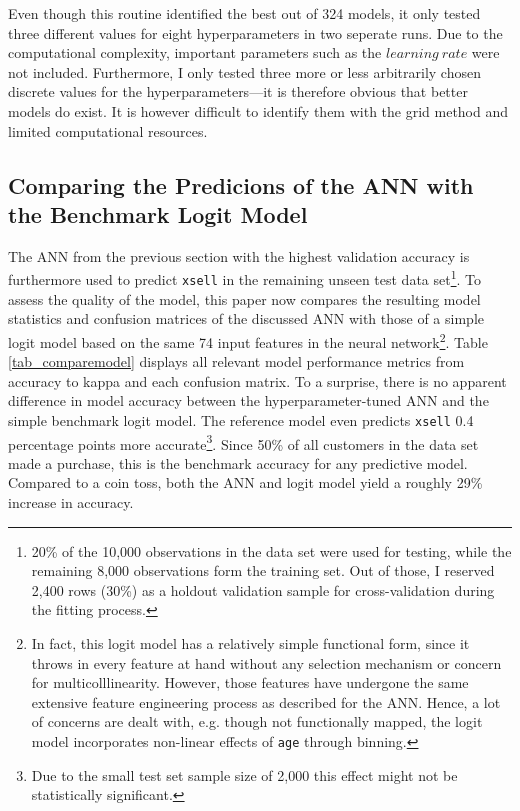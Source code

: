 \documentclass[12pt,a4paper]{article}
\let\code=\texttt
\begin{document}
Even though this routine identified the best out of 324 models, it only tested three different values for eight hyperparameters in two seperate runs.
Due to the computational complexity, important parameters such as the $learning\ rate$ were not included.
Furthermore, I only tested three more or less arbitrarily chosen discrete values for the hyperparameters---it is therefore obvious that
better models do exist. It is however difficult to identify them with the grid method and limited computational resources.

\subsection{Comparing the Predicions of the ANN with the Benchmark Logit Model}

The ANN from the previous section with the highest validation accuracy is furthermore used to predict \code{xsell} in the remaining unseen test data set\footnote{20\% 
of the 10,000 observations in the data set were used for testing, while the remaining 8,000 observations form the training set. Out of those, I reserved
2,400 rows (30\%) as a holdout validation sample for cross-validation during the fitting process.}.
To assess the quality of the model, this paper now compares the resulting model statistics and confusion matrices of the discussed ANN with those of a 
simple logit model based on the same 74 input features in the neural network\footnote{In fact, this logit model has a relatively simple functional form, 
since it throws in every feature at hand without any selection mechanism or concern for multicolllinearity.
However, those features have undergone the same extensive feature engineering process as described for the ANN.
Hence, a lot of concerns are dealt with, e.g. though not functionally mapped, the logit model incorporates non-linear effects of \code{age} through binning.}.
Table \ref{tab_comparemodel} displays all relevant model performance metrics from accuracy to kappa and each confusion matrix.
To a surprise, there is no apparent difference in model accuracy between the hyperparameter-tuned ANN and the simple benchmark logit model.
The reference model even predicts \code{xsell} 0.4 percentage points more accurate\footnote{Due to the small test set sample size of 2,000 this 
effect might not be statistically significant.}.
Since 50\% of all customers in the data set made a purchase, this is the benchmark accuracy for any predictive model.
Compared to a coin toss, both the ANN and logit model yield a roughly 29\% increase in accuracy.
\end{document}
